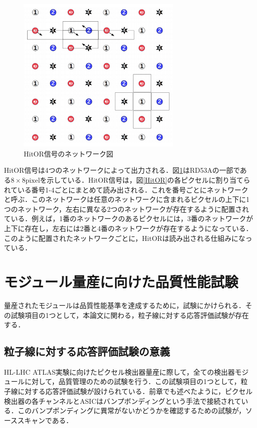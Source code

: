 \begin{figure}[h]
  \centering
  \includegraphics[width=8cm]{./figure/HitOR.png}
  \caption{HitOR信号のネットワーク図}
  \label{fig:HitOR}
\end{figure}

HitOR信号は4つのネットワークによって出力される．図\ref{fig:HitOR}はRD53Aの一部である$8 \times 8 \mathrm{pixel}$を示している．HitOR信号は，図\ref{HitOR}の各ピクセルに割り当てられている番号1-4ごとにまとめて読み出される．これを番号ごとにネットワークと呼ぶ．このネットワークは任意のネットワークに含まれるピクセルの上下に1つのネットワーク，左右に異なる2つのネットワークが存在するように配置されている．例えば，1番のネットワークのあるピクセルには，3番のネットワークが上下に存在し，左右には2番と4番のネットワークが存在するようになっている．このように配置されたネットワークごとに，HitORは読み出される仕組みになっている．

\section{モジュール量産に向けた品質性能試験}
\label{sec:moduletest}
量産されたモジュールは品質性能基準を達成するために，試験にかけられる．その試験項目の1つとして，本論文に関わる，粒子線に対する応答評価試験が存在する．

\subsection{粒子線に対する応答評価試験の意義}
HL-LHC ATLAS実験に向けたピクセル検出器量産に際して，全ての検出器モジュールに対して，品質管理のための試験を行う．この試験項目の1つとして，粒子線に対する応答評価試験が設けられている．前章でも述べたように，ピクセル検出器の各チャンネルとASICはバンプボンディングという手法で接続されている．このバンプボンディングに異常がないかどうかを確認するための試験が，ソーススキャンである．\par

